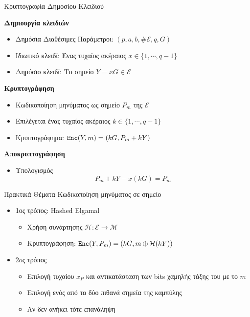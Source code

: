 \documentclass[handout]{beamer}
\begin{document}
\begin{frame}{Κρυπτογραφία Δημοσίου Κλειδιού}

\textbf{Δημιουργία κλειδιών }
\begin{itemize}
\item Δημόσια Διαθέσιμες Παράμετροι: $(p,a,b,\# \mathcal E,q,G)$ \pause
\item Ιδιωτικό κλειδί: Ένας τυχαίος ακέραιος $x \in \{1, \cdots, q-1 \}$ \pause
\item Δημόσιο κλειδί: Το σημείο $Y=xG \in \mathcal{E}$ \pause
\end{itemize}

\textbf{Κρυπτογράφηση}
\begin{itemize}
\item Κωδικοποίηση μηνύματος ως σημείο $P_m$ της $\mathcal{E}$ \pause
\item Επιλέγεται ένας τυχαίος ακέραιος $k \in \{1, \cdots, q-1 \}$ \pause
\item Κρυπτογράφημα: $\mathtt{Enc}(Y,m) = (kG,P_m+kY)$ \pause
\end{itemize}

\textbf{Αποκρυπτογράφηση}
\begin{itemize}
\item Υπολογισμός \[P_m+kY-x(kG)=P_m\] 
\end{itemize}

\end{frame}


\begin{frame}{Πρακτικά Θέματα}
Κωδικοποίηση μηνύματος σε σημείο
\begin{itemize}
\item 1ος τρόπος: Hashed Elgamal
\begin{itemize}
\item Χρήση συνάρτησης $\mathcal{H}: \mathcal{E} \rightarrow \mathcal{M}$
\item Κρυπτογράφηση: $\mathtt{Enc}(Y,P_m) = (kG, m\oplus \mathcal{H}(kY))$
\end{itemize}
\item 2oς τρόπος
\begin{itemize}
\item Επιλογή τυχαίου $x_P$ και αντικατάσταση των bits χαμηλής τάξης του με το $m$
\item Επιλογή ενός από τα δύο πιθανά σημεία της καμπύλης
\item Αν δεν ανήκει τότε επανάληψη
\end{itemize}
\end{itemize}
\end{frame}
\end{document}
